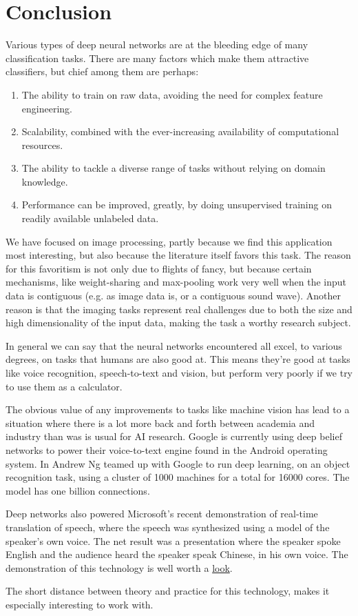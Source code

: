 \documentclass[11pt]{article}
\begin{document}
\section{Conclusion}

Various types of deep neural networks are at the bleeding edge of many classification tasks.  There are many factors which make them attractive classifiers, but chief among them are perhaps:
\begin{enumerate}
\item The ability to train on raw data, avoiding the need for complex feature engineering.
\item Scalability, combined with the ever-increasing availability of computational resources.
\item The ability to tackle a diverse range of tasks without relying on domain knowledge.
\item Performance can be improved, greatly, by doing unsupervised training on readily available unlabeled data.
\end{enumerate}

We have focused on image processing, partly because we find this application most interesting, but also because the literature itself favors this task.  The reason for this favoritism is not only due to flights of fancy, but because certain mechanisms, like weight-sharing and max-pooling work very well when the input data is contiguous (e.g. as image data is, or a contiguous sound wave).  Another reason is that the imaging tasks represent real challenges due to both the size and high dimensionality of the input data, making the task a worthy research subject.

In general we can say that the neural networks encountered all excel, to various degrees, on tasks that humans are also good at.  This means they're good at tasks like voice recognition, speech-to-text and vision, but perform very poorly if we try to use them as a calculator.

The obvious value of any improvements to tasks like machine vision has lead to a situation where there is a lot more back and forth between academia and industry than was is usual for AI research.  Google is currently using deep belief networks to power their voice-to-text engine found in the Android operating system.  In \cite{ng} Andrew Ng teamed up with Google to run deep learning, on an object recognition task, using a cluster of 1000 machines for a total for 16000 cores.  The model has one billion connections.

Deep networks also powered Microsoft's recent demonstration of real-time translation of speech, where the speech was synthesized using a model of the speaker's own voice.  The net result was a presentation where the speaker spoke English and the audience heard the speaker speak Chinese, in his own voice.  The demonstration of this technology is well worth a \href{http://www.youtube.com/watch?v=Nu-nlQqFCKg}{look}.

The short distance between theory and practice for this technology, makes it especially interesting to work with.



\end{document}
